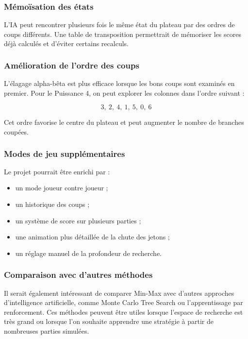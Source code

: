 \documentclass[12pt,a4paper]{article}
\begin{document}
\subsubsection{Mémoïsation des états}

L'IA peut rencontrer plusieurs fois le même état du plateau par des ordres de coups différents. Une table de transposition permettrait de mémoriser les scores déjà calculés et d'éviter certains recalculs.

\subsubsection{Amélioration de l'ordre des coups}

L'élagage alpha-bêta est plus efficace lorsque les bons coups sont examinés en premier. Pour le Puissance 4, on peut explorer les colonnes dans l'ordre suivant :

\[
    3,\ 2,\ 4,\ 1,\ 5,\ 0,\ 6
\]

Cet ordre favorise le centre du plateau et peut augmenter le nombre de branches coupées.

\subsubsection{Modes de jeu supplémentaires}

Le projet pourrait être enrichi par :

\begin{itemize}[leftmargin=1.2cm]
    \item un mode joueur contre joueur ;
    \item un historique des coups ;
    \item un système de score sur plusieurs parties ;
    \item une animation plus détaillée de la chute des jetons ;
    \item un réglage manuel de la profondeur de recherche.
\end{itemize}

\subsubsection{Comparaison avec d'autres méthodes}

Il serait également intéressant de comparer Min-Max avec d'autres approches d'intelligence artificielle, comme Monte Carlo Tree Search ou l'apprentissage par renforcement. Ces méthodes peuvent être utiles lorsque l'espace de recherche est très grand ou lorsque l'on souhaite apprendre une stratégie à partir de nombreuses parties simulées.
\end{document}

